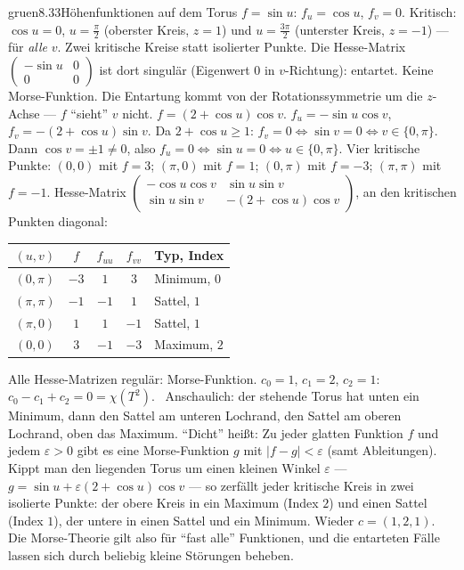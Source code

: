 \begin{loesungkarte}{gruen}{8.33}{Höhenfunktionen auf dem Torus}
$f = \sin u$: $f_u = \cos u$, $f_v = 0$. Kritisch: $\cos u = 0$, $u = \frac\pi2$ (oberster Kreis, $z = 1$) und $u = \frac{3\pi}2$ (unterster Kreis, $z = -1$) --- für \emph{alle} $v$. Zwei kritische Kreise statt isolierter Punkte. Die Hesse-Matrix $\begin{pmatrix}-\sin u&0\\0&0\end{pmatrix}$ ist dort singulär (Eigenwert $0$ in $v$-Richtung): entartet. Keine Morse-Funktion. Die Entartung kommt von der Rotationssymmetrie um die $z$-Achse --- $f$ \enquote{sieht} $v$ nicht.
$f = (2 + \cos u)\cos v$. $f_u = -\sin u\cos v$, $f_v = -(2 + \cos u)\sin v$. Da $2 + \cos u\ge1$: $f_v = 0\iff\sin v = 0\iff v\in\{0, \pi\}$. Dann $\cos v = \pm1\neq0$, also $f_u = 0\iff\sin u = 0\iff u\in\{0, \pi\}$. Vier kritische Punkte: $(0, 0)$ mit $f = 3$; $(\pi, 0)$ mit $f = 1$; $(0, \pi)$ mit $f = -3$; $(\pi, \pi)$ mit $f = -1$.
Hesse-Matrix $\begin{pmatrix}-\cos u\cos v&\sin u\sin v\\\sin u\sin v&-(2 + \cos u)\cos v\end{pmatrix}$, an den kritischen Punkten diagonal:
\begin{center}\small
\begin{tabular}{c|c|c|c|l}
$(u, v)$ & $f$ & $f_{uu}$ & $f_{vv}$ & Typ, Index\\ \hline
$(0, \pi)$ & $-3$ & $1$ & $3$ & Minimum, $0$\\
$(\pi, \pi)$ & $-1$ & $-1$ & $1$ & Sattel, $1$\\
$(\pi, 0)$ & $1$ & $1$ & $-1$ & Sattel, $1$\\
$(0, 0)$ & $3$ & $-1$ & $-3$ & Maximum, $2$
\end{tabular}
\end{center}
Alle Hesse-Matrizen regulär: Morse-Funktion. $c_0 = 1$, $c_1 = 2$, $c_2 = 1$: $c_0 - c_1 + c_2 = 0 = \chi(T^{2})$. \checkmark\ Anschaulich: der stehende Torus hat unten ein Minimum, dann den Sattel am unteren Lochrand, den Sattel am oberen Lochrand, oben das Maximum.
\enquote{Dicht} heißt: Zu jeder glatten Funktion $f$ und jedem $\varepsilon > 0$ gibt es eine Morse-Funktion $g$ mit $|f - g| < \varepsilon$ (samt Ableitungen). Kippt man den liegenden Torus um einen kleinen Winkel $\varepsilon$ --- $g = \sin u + \varepsilon(2 + \cos u)\cos v$ --- so zerfällt jeder kritische Kreis in zwei isolierte Punkte: der obere Kreis in ein Maximum (Index $2$) und einen Sattel (Index $1$), der untere in einen Sattel und ein Minimum. Wieder $c = (1, 2, 1)$. Die Morse-Theorie gilt also für \enquote{fast alle} Funktionen, und die entarteten Fälle lassen sich durch beliebig kleine Störungen beheben.

\end{loesungkarte}
